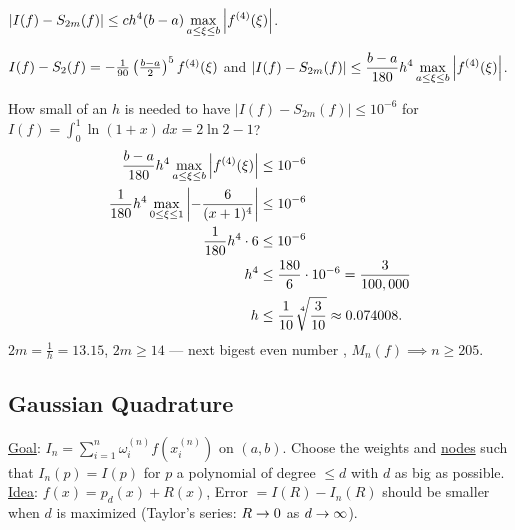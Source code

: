 \documentclass[]{article}
\begin{document}
\begin{corollary}
	$\displaystyle|I(f)-S_{2m}(f)| \leq ch^4(b-a)\max_{a\leq\xi\leq b} \left|f^{(4)}(\xi)\right|$.
\end{corollary}
\begin{fact}
	$I(f)-S_2(f) = -\frac1{90}\left(\frac{b-a}2\right)^5 f^{(4)}(\xi)$ and
	$\displaystyle|I(f)-S_{2m}(f)|\leq\frac{b-a}{180}h^4\max_{a\leq\xi\leq b}\left|f^{(4)}(\xi)\right|$.
\end{fact}
\begin{example}
	How small of an $h$ is needed to have $|I(f)-S_{2m}(f)|\leq 10^{-6}$ for $I(f) = \int_0^1 \ln(1+x)\,dx = 2\ln2-1$?
	\begin{align*}
		\frac{b-a}{180} h^4 \max_{a\leq\xi\leq b} \mlr{f^{(4)}(\xi)}
		&\leq 10^{-6} \\
		\frac1{180} h^4 \max_{0\leq\xi\leq1} \mlr{-\frac6{(x+1)^4}}
		&\leq 10^{-6} \\
		\frac1{180} h^4 \cdot 6 &\leq 10^{-6} \\
		h^4 &\leq \frac{180}6\cdot10^{-6} = \frac3{100,000} \\
		h &\leq \frac1{10} \nrt4{\frac3{10}} \approx 0.074008.
	\end{align*}
	$2m = \frac1h = 13.15$, $2m\geq14$ --- next bigest even number , $M_n(f)\implies n\geq 205$.
\end{example}

\subsection*{Gaussian Quadrature}

\ul{Goal}: $I_n = \sum_{i=1}^n \omega_i^{(n)} f(x_i^{(n)})$ on $(a,b)$.
Choose the weights and \ul{nodes} such that $I_n(p) = I(p)$ for $p$ a polynomial of degree $\leq d$ with $d$ as big as possible.
\ul{Idea}: $f(x) = p_d(x) + R(x)$, Error $= I(R)-I_n(R)$ should be smaller when $d$ is maximized (Taylor's series: $R\rightarrow0$ as $d\rightarrow\infty$).
\end{document}
